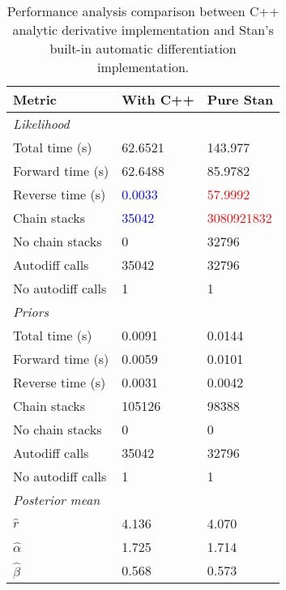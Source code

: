 \documentclass[11pt]{article}
\begin{document}
\begin{table}[H]
\tabcolsep=0.4cm
\begin{longtable}{lll}
    \toprule
    \textbf{Metric} & \textbf{With C++} & \textbf{Pure Stan} \\
    \midrule
    \endfirsthead
 	
    \multicolumn{3}{l}{\textit{Likelihood}} \\
    Total time (s) & 62.6521 & 143.977 \\
    Forward time (s) & 62.6488 & 85.9782 \\
    Reverse time (s) & \textcolor{blue}{0.0033} & \textcolor{red}{57.9992} \\
    Chain stacks & \textcolor{blue}{35042} & \textcolor{red}{3080921832} \\
    No chain stacks & 0 & 32796 \\
    Autodiff calls & 35042 & 32796 \\
    No autodiff calls & 1 & 1 \\
    \midrule
    \multicolumn{3}{l}{\textit{Priors}} \\
    Total time (s) & 0.0091 & 0.0144 \\
    Forward time (s) & 0.0059 & 0.0101 \\
    Reverse time (s) & 0.0031 & 0.0042 \\
    Chain stacks & 105126 & 98388 \\
    No chain stacks & 0 & 0 \\
    Autodiff calls & 35042 & 32796 \\
    No autodiff calls & 1 & 1 \\
    \midrule
    \multicolumn{3}{l}{\textit{Posterior mean}} \\
    $\hat r$  & 4.136 & 4.070 \\
    $\hat \alpha$ & 1.725 & 1.714 \\
    $\hat \beta$ & 0.568 & 0.573 \\
    \bottomrule
\end{longtable}
\caption{Performance analysis comparison between C++ analytic derivative implementation and Stan's built-in automatic differentiation implementation.}
\end{table}
\end{document}
